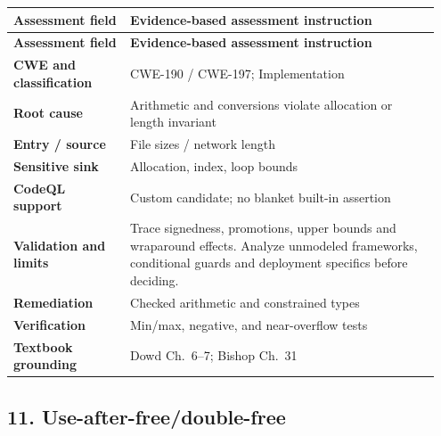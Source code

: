 \documentclass[11pt,letterpaper,oneside]{book}
\begin{document}
\small
\setlength{\tabcolsep}{2pt}
\renewcommand{\arraystretch}{1.18}
\begin{longtable}{>{\raggedright\arraybackslash}p{0.26\linewidth}>{\raggedright\arraybackslash}p{0.69\linewidth}}
\toprule
\textbf{Assessment field} & \textbf{Evidence-based assessment instruction}\\
\midrule
\endfirsthead
\toprule
\textbf{Assessment field} & \textbf{Evidence-based assessment instruction}\\
\midrule
\endhead
\textbf{CWE and classification} & CWE-190 / CWE-197; Implementation\\
\textbf{Root cause} & Arithmetic and conversions violate allocation or length invariant\\
\textbf{Entry / source} & File sizes / network length\\
\textbf{Sensitive sink} & Allocation, index, loop bounds\\
\textbf{CodeQL support} & Custom candidate; no blanket built-in assertion\\
\textbf{Validation and limits} & Trace signedness, promotions, upper bounds and wraparound effects. Analyze unmodeled frameworks, conditional guards and deployment specifics before deciding.\\
\textbf{Remediation} & Checked arithmetic and constrained types\\
\textbf{Verification} & Min/max, negative, and near-overflow tests\\
\textbf{Textbook grounding} & Dowd Ch.~6--7; Bishop Ch.~31\\
\bottomrule
\end{longtable}
\normalsize

\subsection{11. Use-after-free/double-free}
\end{document}
